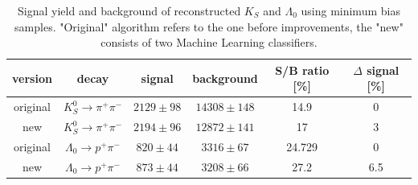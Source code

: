 \begin{table}[h]
\centering
\caption{Signal yield and background of reconstructed $K_S$ and $\Lambda_0$ using minimum bias samples.  "Original" algorithm refers to the one before improvements, the "new" consists of two Machine Learning classifiers. }
\hspace*{-0.8cm}
\begin{tabular}{|c|c|c|c|c|c|}
\hline
version     & decay                               & signal                     & background                   & S/B ratio {[}\%{]} &  $\Delta$ signal [\%] \\ \hline 

original & $K_S^0 \rightarrow \pi^+ \pi^-$     & $2129 \pm 98$ & $14308 \pm 148$ & 14.9               & 0                           \\\hline 
new      & $K_S^0 \rightarrow \pi^+ \pi^-$     & $2194 \pm 96$ & $12872 \pm 141$ & 17                 & 3                           \\ \hline 
original & $\Lambda_0 \rightarrow p^+ \pi^-$ & $820\pm 44$                & $3316 \pm 67$   & 24.729             & 0                           \\ \hline 
new      & $\Lambda_0 \rightarrow p^+ \pi^-$ & $873 \pm 44$               & $3208 \pm 66 $  & 27.2               & 6.5   \\ \hline 
                    \end{tabular}
\label{tab:signal}
\end{table}

